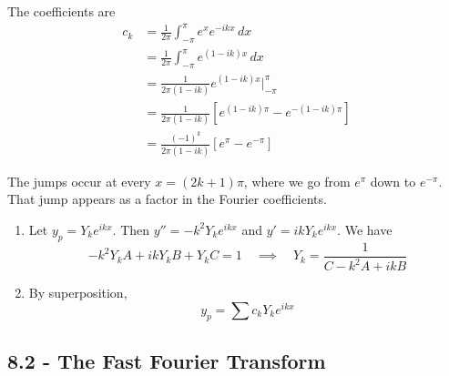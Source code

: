 \documentclass[a4paper]{article}
\begin{document}
The coefficients are
\begin{align*}
	c_{k} & = \frac{1}{2 \pi} \int^{\pi}_{-\pi} e^{x}e^{-ikx} \, dx \\
	 & = \frac{1}{2 \pi} \int^{\pi}_{-\pi} e^{\!\left( 1 - ik \right)x} \, dx \\
	 & = \frac{1}{2 \pi \!\left( 1 - ik \right)} e^{\!\left( 1 - ik \right)x} \Big|^{\pi}_{-\pi} \\
	 & = \frac{1}{2 \pi \!\left( 1 - ik \right)} \!\left[ e^{\!\left( 1 - ik \right)\pi } - e^{-\!\left( 1 - ik \right) \pi} \right] \\
	 & = \frac{\!\left( -1 \right)^{k}}{2 \pi \!\left( 1 - ik \right)} \!\left[ e^{\pi} - e^{-\pi} \right]
\end{align*}

The jumps occur at every \( x = \!\left( 2k + 1 \right)\pi \), where we go from \( e^{\pi} \) down to \( e^{-\pi} \). That jump appears as a factor in the Fourier coefficients.

\vspace{12pt}


\begin{enumerate}[label=(\alph*)]
	\item Let \( y_{p} = Y_{k}e^{ikx} \). Then \( y'' = -k^{2}Y_{k}e^{ikx} \) and \( y' = ikY_{k}e^{ikx} \). We have
	\[
		-k^{2}Y_{k}A + ikY_{k}B + Y_{k}C = 1 \quad \implies \quad Y_{k} = \frac{1}{C - k^{2}A + ikB}
	\]
	\item By superposition,
	\[
		y_{p} = \sum c_{k}Y_{k}e^{ikx}
	\]
\end{enumerate}

\newpage
\subsection{\textsf{8.2 - The Fast Fourier Transform}}
\end{document}
